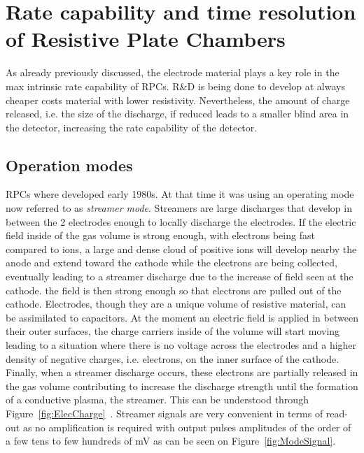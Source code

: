\section{Rate capability and time resolution of Resistive Plate Chambers}
\label{sec:RateCapa}

	As already previously discussed, the electrode material plays a key role in the max intrinsic rate capability of RPCs. R\&D is being done to develop at always cheaper costs material with lower resistivity. Nevertheless, the amount of charge released, i.e. the size of the discharge, if reduced leads to a smaller blind area in the detector, increasing the rate capability of the detector.
	
	\subsection{Operation modes}
	\label{chapt4:ssec:operation}
	
	RPCs where developed early 1980s. At that time it was using an operating mode now referred to as \textit{streamer mode}. Streamers are large discharges that develop in between the 2 electrodes enough to locally discharge the electrodes. If the electric field inside of the gas volume is strong enough, with electrons being fast compared to ions, a large and dense cloud of positive ions will develop nearby the anode and extend toward the cathode while the electrons are being collected, eventually leading to a streamer discharge due to the increase of field seen at the cathode. the field is then strong enough so that electrons are pulled out of the cathode. Electrodes, though they are a unique volume of resistive material, can be assimilated to capacitors. At the moment an electric field is applied in between their outer surfaces, the charge carriers inside of the volume will start moving leading to a situation where there is no voltage across the electrodes and a higher density of negative charges, i.e. electrons, on the inner surface of the cathode. Finally, when a streamer discharge occurs, these electrons are partially released in the gas volume contributing to increase the discharge strength until the formation of a conductive plasma, the streamer. This can be understood through Figure~\ref{fig:ElecCharge}~\cite{CROTTY93}. Streamer signals are very convenient in terms of read-out as no amplification is required with output pulses amplitudes of the order of a few tens to few hundreds of \si{mV} as can be seen on Figure~\ref{fig:ModeSignal}.
	
